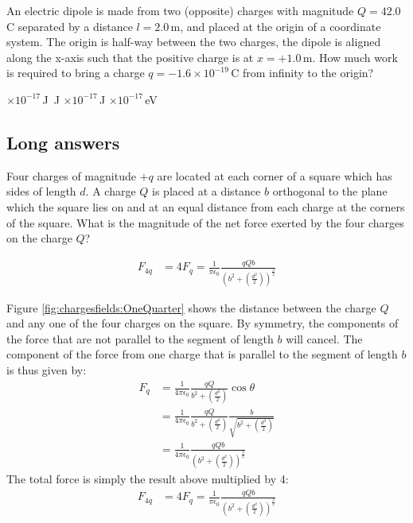 \question An electric dipole is made from two (opposite) charges with magnitude $Q=42.0$\,C separated by a distance $l=2.0$\,m, and placed at the origin of a coordinate system. The origin is half-way between the two charges, the dipole is aligned along the x-axis such that the positive charge is at $x=+1.0$\,m. How much work is required to bring a charge $q=-1.6\times 10^{-19}$\,C from infinity to the origin?
\begin{checkboxes}
 $\times 10^{-17}$\,J
\,J \correct
{} $\times 10^{-17}$\,J
 $\times 10^{-17}$\,eV
\end{checkboxes}



%
%
\subsection{Long answers}
\question Four charges of magnitude $+q$ are located at each corner of a square which has sides of length $d$. A charge $Q$ is placed at a distance $b$ orthogonal to the plane which the square lies on and at an equal distance from each charge at the corners of the square. What is the magnitude of the net force exerted by the four charges on the charge $Q$?

\begin{finalanswer}
\begin{align*}
F_{4q}&=4F_q=\frac{1}{\pi\epsilon_0}\frac{qQb}{\left(b^2+\left( \frac{d^2}{2}\right)\right)^{\frac{3}{2}}}
\end{align*}
\end{finalanswer}
\begin{solution}
Figure \ref{fig:chargesfields:OneQuarter} shows the distance between the charge $Q$ and any one of the four charges on the square. 
By symmetry, the components of the force that are not parallel to the segment of length $b$ will cancel. The component of the force from one charge that is parallel to the segment of length $b$ is thus given by:
\begin{align*}
F_q&=\frac{1}{4\pi\epsilon_0}\frac{qQ}{b^2+\left( \frac{d^2}{2}\right)}\cos\theta\\
&=\frac{1}{4\pi\epsilon_0}\frac{qQ}{b^2+\left( \frac{d^2}{2}\right)}\frac{b}{\sqrt{b^2+\left( \frac{d^2}{2}\right)}}\\
&=\frac{1}{4\pi\epsilon_0}\frac{qQb}{\left(b^2+\left( \frac{d^2}{2}\right)\right)^{\frac{3}{2}}}
\end{align*}
The total force is simply the result above multiplied by 4:
\begin{align*}
F_{4q}&=4F_q=\frac{1}{\pi\epsilon_0}\frac{qQb}{\left(b^2+\left( \frac{d^2}{2}\right)\right)^{\frac{3}{2}}}
\end{align*}
\end{solution}

